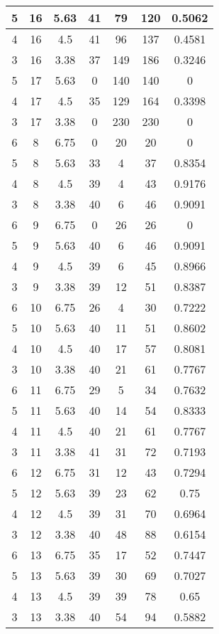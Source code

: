 \documentclass[letterpaper, 12pt]{article}
\begin{document}
\begin{longtable}{|c|c|c|c|c|c|c|}
\hline
5 & 16 & 5.63 & 41 & 79 & 120 & 0.5062 \\
\hline
4 & 16 & 4.5 & 41 & 96 & 137 & 0.4581 \\
\hline
3 & 16 & 3.38 & 37 & 149 & 186 & 0.3246 \\
\hline
5 & 17 & 5.63 & 0 & 140 & 140 & 0 \\
\hline
4 & 17 & 4.5 & 35 & 129 & 164 & 0.3398 \\
\hline
3 & 17 & 3.38 & 0 & 230 & 230 & 0 \\
\hline
6 & 8 & 6.75 & 0 & 20 & 20 & 0 \\
\hline
5 & 8 & 5.63 & 33 & 4 & 37 & 0.8354 \\
\hline
4 & 8 & 4.5 & 39 & 4 & 43 & 0.9176 \\
\hline
3 & 8 & 3.38 & 40 & 6 & 46 & 0.9091 \\
\hline
6 & 9 & 6.75 & 0 & 26 & 26 & 0 \\
\hline
5 & 9 & 5.63 & 40 & 6 & 46 & 0.9091 \\
\hline
4 & 9 & 4.5 & 39 & 6 & 45 & 0.8966 \\
\hline
3 & 9 & 3.38 & 39 & 12 & 51 & 0.8387 \\
\hline
6 & 10 & 6.75 & 26 & 4 & 30 & 0.7222 \\
\hline
5 & 10 & 5.63 & 40 & 11 & 51 & 0.8602 \\
\hline
4 & 10 & 4.5 & 40 & 17 & 57 & 0.8081 \\
\hline
3 & 10 & 3.38 & 40 & 21 & 61 & 0.7767 \\
\hline
6 & 11 & 6.75 & 29 & 5 & 34 & 0.7632 \\
\hline
5 & 11 & 5.63 & 40 & 14 & 54 & 0.8333 \\
\hline
4 & 11 & 4.5 & 40 & 21 & 61 & 0.7767 \\
\hline
3 & 11 & 3.38 & 41 & 31 & 72 & 0.7193 \\
\hline
6 & 12 & 6.75 & 31 & 12 & 43 & 0.7294 \\
\hline
5 & 12 & 5.63 & 39 & 23 & 62 & 0.75 \\
\hline
4 & 12 & 4.5 & 39 & 31 & 70 & 0.6964 \\
\hline
3 & 12 & 3.38 & 40 & 48 & 88 & 0.6154 \\
\hline
6 & 13 & 6.75 & 35 & 17 & 52 & 0.7447 \\
\hline
5 & 13 & 5.63 & 39 & 30 & 69 & 0.7027 \\
\hline
4 & 13 & 4.5 & 39 & 39 & 78 & 0.65 \\
\hline
3 & 13 & 3.38 & 40 & 54 & 94 & 0.5882 \\
\hline

\end{longtable}
\end{document}
